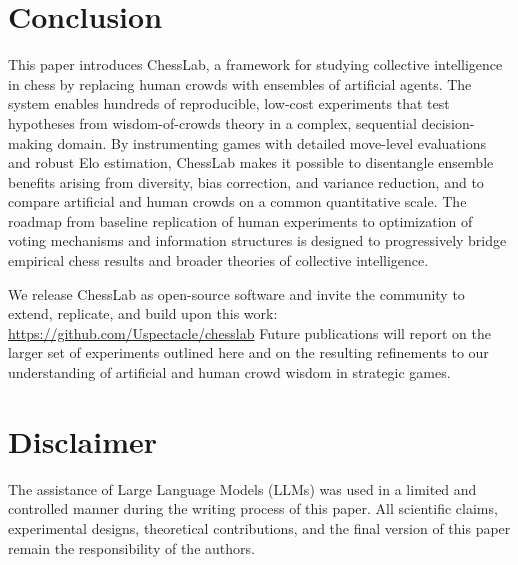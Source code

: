 \documentclass[sigconf]{aamas}
\begin{document}
\section{Conclusion}

This paper introduces ChessLab, a framework for studying collective intelligence in chess by replacing human crowds with ensembles of artificial agents.
The system enables hundreds of reproducible, low-cost experiments that test hypotheses from wisdom-of-crowds theory in a complex, sequential decision-making domain.
By instrumenting games with detailed move-level evaluations and robust Elo estimation, ChessLab makes it possible to disentangle ensemble benefits arising from diversity, bias correction, and variance reduction, and to compare artificial and human crowds on a common quantitative scale.
The roadmap from baseline replication of human experiments to optimization of voting mechanisms and information structures is designed to progressively bridge empirical chess results and broader theories of collective intelligence.

We release ChessLab as open-source software and invite the community to extend, replicate, and build upon this work: \url{https://github.com/Uspectacle/chesslab}
Future publications will report on the larger set of experiments outlined here and on the resulting refinements to our understanding of artificial and human crowd wisdom in strategic games.

\section*{Disclaimer}

The assistance of Large Language Models (LLMs) was used in a limited and controlled manner during the writing process of this paper.
All scientific claims, experimental designs, theoretical contributions, and the final version of this paper remain the responsibility of the authors.

\balance


\end{document}
